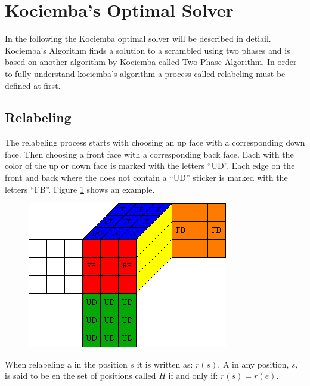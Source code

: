 \section{Kociemba's Optimal Solver}
In the following the Kociemba optimal solver\cite{kociemba09} will be described in detiail. Kociemba's Algorithm finds a solution to a scrambled \rubik{} using two phases and is based on another algorithm by Kociemba called Two Phase Algorithm. In order to fully understand kociemba's algorithm a process called relabeling must be defined at first. 

\subsection{Relabeling}
The relabeling process  starts with choosing an up face with a corresponding down face. Then choosing a front face with a corresponding back face. Each \facelet{} with the color of the up or down face is marked with the letters ``UD''.  Each edge \piece{} on the front and back where the \piece{} does not contain a ``UD'' sticker is marked with the letters ``FB''. Figure \ref{fig:relabelClean} shows an example.


\begin{figure}[hb]
	\centering
		\includegraphics[scale = 0.8]{input/pics/relabelClean}
	\caption{}
	\label{fig:relabelClean}
\end{figure}

When relabeling a \rubik{} in the position $s$ it is written as: $r(s)$. A \rubik{} in any position, $s$, is said to be en the set of positions called $H$ if and only if: $r(s)=r(e)$.

